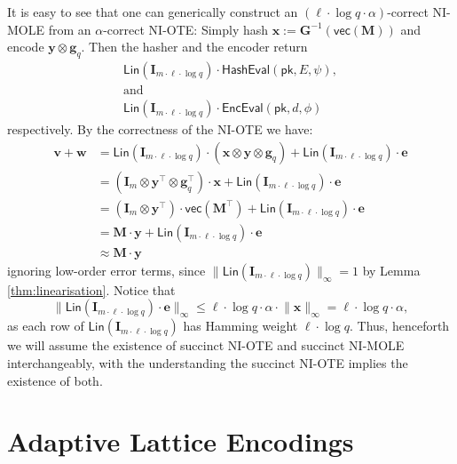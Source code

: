 \documentclass{article}
\newcommand{\algofont}[1]{\ensuremath{\mathsf{#1}}}
\newcommand{\Enc}{{\algofont{Enc}}}
\newcommand{\Eval}{\algofont{Eval}\xspace}
\newcommand{\Hash}{{\algofont{Hash}}}
\newcommand{\id}{\ensuremath{\mathbf{I}}}
\newcommand{\pk}{{\mathsf{pk}}}
\newcommand{\seclab}[1]{\label{sec:#1}}
\begin{document}
It is easy to see that one can generically construct an $(\ell\cdot \log q\cdot \alpha)$-correct NI-MOLE from an $\alpha$-correct NI-OTE: Simply hash $\mathbf{x} := \mathbf{G}^{-1}(\mathsf{vec}(\mathbf{M}))$ and encode $\mathbf{y}\otimes \mathbf{g}_q$. Then the hasher and the encoder return
\begin{gather*}
\mathsf{Lin}(\id_{m\cdot \ell\cdot \log q})\cdot\Hash\Eval(\pk, E, \psi), \\
\text{and}
\\
\mathsf{Lin}(\id_{m\cdot \ell\cdot \log q})\cdot\Enc\Eval(\pk, d, \phi)
\end{gather*}
respectively. By the correctness of the NI-OTE we have:
\begin{align*}
\mathbf{v}+\mathbf{w}&=\mathsf{Lin}(\id_{m\cdot \ell\cdot \log q})\cdot (\mathbf{x}\otimes \mathbf{y}\otimes \mathbf{g}_q)+\mathsf{Lin}(\id_{m\cdot \ell\cdot \log q})\cdot \mathbf{e}\\
&=(\id_{m}\otimes \mathbf{y}^\intercal\otimes \mathbf{g}_q^\intercal)\cdot \mathbf{x}+\mathsf{Lin}(\id_{m\cdot \ell\cdot \log q})\cdot \mathbf{e}\\
&=(\id_{m}\otimes \mathbf{y}^\intercal)\cdot \mathsf{vec}(\mathbf{M}^\intercal)+\mathsf{Lin}(\id_{m\cdot \ell\cdot \log q})\cdot \mathbf{e}\\
&=\mathbf{M}\cdot \mathbf{y}+\mathsf{Lin}(\id_{m\cdot \ell\cdot \log q})\cdot \mathbf{e}\\
&\approx\mathbf{M}\cdot \mathbf{y}
\end{align*}
ignoring low-order error terms, since $\lVert \mathsf{Lin}(\id_{m\cdot \ell\cdot \log q}) \rVert_\infty=1$ by Lemma \ref{thm:linearisation}.  Notice that \[\lVert \mathsf{Lin}(\id_{m\cdot \ell\cdot \log q})\cdot \mathbf{e}\rVert_\infty\le \ell\cdot\log q\cdot \alpha\cdot \lVert \mathbf{x}\rVert_\infty=\ell\cdot \log q\cdot \alpha,\] 
{as each row of $\mathsf{Lin}(\id_{m\cdot \ell\cdot \log q})$ has Hamming weight $\ell \cdot \log q$.} Thus, henceforth we will assume the existence of succinct NI-OTE and succinct NI-MOLE interchangeably, with the understanding the succinct NI-OTE implies the existence of both.


\section{Adaptive Lattice Encodings}
\seclab{encodings}
\newcommand{\lenc}{\mathsf{LEnc}}
\end{document}
